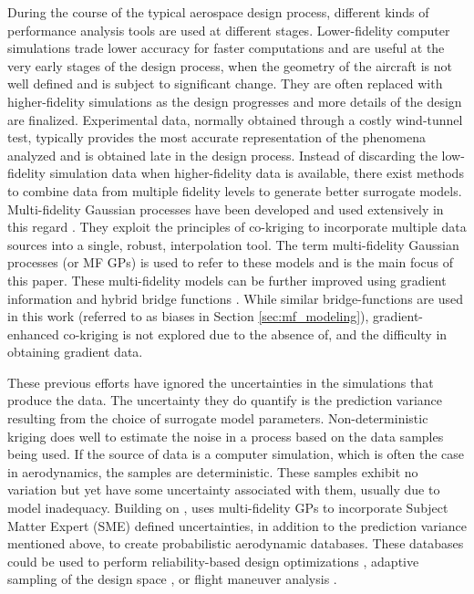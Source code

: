 During the course of the typical aerospace design process, different kinds of performance analysis tools are used at different stages. Lower-fidelity computer simulations trade lower accuracy for faster computations and are useful at the very early stages of the design process, when the geometry of the aircraft is not well defined and is subject to significant change. They are often replaced with higher-fidelity simulations as the design progresses and more details of the design are finalized. Experimental data, normally obtained through a costly wind-tunnel test, typically provides the most accurate representation of the phenomena analyzed and is obtained late in the design process. Instead of discarding the low-fidelity simulation data when higher-fidelity data is available, there exist methods to combine data from multiple fidelity levels to generate better surrogate models. Multi-fidelity Gaussian processes have been developed and used extensively in this regard \cite{kennedy_predicting_2000,le_gratiet_recursive_2014}. They exploit the principles of co-kriging to incorporate multiple data sources into a single, robust, interpolation tool. The term multi-fidelity Gaussian processes (or MF GPs) is used to refer to these models and is the main focus of this paper.  These multi-fidelity models can be further improved using gradient information and hybrid bridge functions \cite{han_improving_2013}. While similar bridge-functions are used in this work (referred to as biases in Section \ref{sec:mf_modeling}), gradient-enhanced co-kriging is not explored due to the absence of, and the difficulty in obtaining gradient data.

These previous efforts have ignored the uncertainties in the simulations that produce the data. The uncertainty they do quantify is the prediction variance resulting from the choice of surrogate model parameters. Non-deterministic kriging \cite{bae_nondeterministic_2019} does well to estimate the noise in a process based on the data samples being used. If the source of data is a computer simulation, which is often the case in aerodynamics, the samples are deterministic. These samples exhibit no variation but yet have some uncertainty associated with them, usually due to model inadequacy. Building on \cite{huang_sequential_2006}, \cite{wendorff_combining_2016} uses multi-fidelity GPs to incorporate Subject Matter Expert (SME) defined uncertainties, in addition to the prediction variance mentioned above, to create probabilistic aerodynamic databases. These databases could be used to perform reliability-based design optimizations \cite{gaul_modified_2014}, adaptive sampling of the design space \cite{picheny_noisy_2014}, or flight maneuver analysis \cite{wendorff_combining_2016}.


